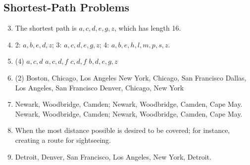 \documentclass[12pt, A4]{article}
\newcommand{\enumset}[1]{\setcounter{enumi}{#1}}
\begin{document}
	\subsection{Shortest-Path Problems}
		\begin{enumerate}
			\enumset{2}
			\item
				The shortest path is \(a, c, d, e, g, z\), which has length 16.	
			\enumset{4}
			\item
				2: \(a, b, e, d, z\); 3: \(a, c, d, e, g, z\); 4: \(a, b, e, h, l, m, p, s, z\).
			\enumset{6}
			\item
				\begin{tasks}(4)
					\task
						\(a, c, d\)
					\task
						\(a, c, d, f\)
					\task
						\(c, d, f\)
					\task
						\(b, d, e, g, z\)	
				\end{tasks}
			\enumset{10}
			\item
				\begin{tasks}(2)
					\task
						Boston, Chicago, Los Angeles
					\task
						New York, Chicago, San Francisco
					\task
						Dallas, Los Angeles, San Francisco
					\task
						Denver, Chicago, New York
				\end{tasks}
			\enumset{16}
			\item
				\begin{tasks}
					\task
						Newark, Woodbridge, Camden; Newark, Woodbridge, Camden, Cape May.
					\task
						Newark, Woodbridge, Camden; Newark, Woodbridge, Camden, Cape May.
				\end{tasks}
			\enumset{18}
			\item
				When the most distance possible is desired to be covered; for instance, creating a route for sightseeing.
			\enumset{26}
			\item
				Detroit, Denver, San Francisco, Los Angeles, New York, Detroit.
		\end{enumerate}
\end{document}
